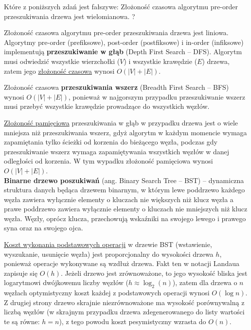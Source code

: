 \answer
{Które z poniższych zdań jest fałszywe:}
{Złożoność czasowa algorytmu pre-order przeszukiwania drzewa jest wielomianowa.}
{?}
{}
{Złożoność czasowa algorytmu pre-order przeszukiwania drzewa jest liniowa. \\

Algorytmy pre-order (prefiksowe), post-order (postfiksowe) i in-order (infiksowe) implementują \textbf{przeszukiwanie w głąb} (Depth First Search -- DFS). Algorytm musi odwiedzić wszystkie wierzchołki ($V$) i wszystkie krawędzie ($E$) drzewa, zatem jego \underline{złożoność czasowa} wynosi $O(|V|+|E|)$.

Złożoność czasowa \textbf{przeszukiwania wszerz} (Breadth First Search -- BFS) wynosi $O(|V|+|E|)$, ponieważ w najgorszym przypadku przeszukiwanie wszerz musi przebyć wszystkie krawędzie prowadzące do wszystkich węzłów.

\underline{Złożoność pamięciowa} przeszukiwania w głąb w przypadku drzewa jest o wiele mniejsza niż przeszukiwania wszerz, gdyż algorytm w każdym momencie wymaga zapamiętania tylko ścieżki od korzenia do bieżącego węzła, podczas gdy przeszukiwanie wszerz wymaga zapamiętywania wszystkich węzłów w danej odległości od korzenia. W tym wypadku złożoność pamięciowa wynosi $O(|V| + |E|)$. \\

\textbf{Binarne drzewo poszukiwań} (ang. Binary Search Tree -- BST) -- dynamiczna struktura danych będąca drzewem binarnym, w którym lewe poddrzewo każdego węzła zawiera wyłącznie elementy o kluczach nie większych niż klucz węzła a prawe poddrzewo zawiera wyłącznie elementy o kluczach nie mniejszych niż klucz węzła. Węzły, oprócz klucza, przechowują wskaźniki na swojego lewego i prawego syna oraz na swojego ojca.

\underline{Koszt wykonania podstawowych operacji} w drzewie BST (wstawienie, wyszukanie, usunięcie węzła) jest proporcjonalny do wysokości drzewa $h$, ponieważ operacje wykonywane są wzdłuż drzewa. Fakt ten w notacji Landaua zapisuje się $O(h)$. Jeżeli drzewo jest zrównoważone, to jego wysokość bliska jest logarytmowi dwójkowemu liczby węzłów ($h \approx \log_2(n)$), zatem dla drzewa o $n$ węzłach optymistyczny koszt każdej z podstawowych operacji wynosi $O(\log n)$. Z drugiej strony drzewo skrajnie niezrównoważone ma wysokość porównywalną z liczbą węzłów (w skrajnym przypadku drzewa zdegenerowanego do listy wartości te są równe: $h=n$), z tego powodu koszt pesymistyczny wzrasta do $O(n)$.
}




